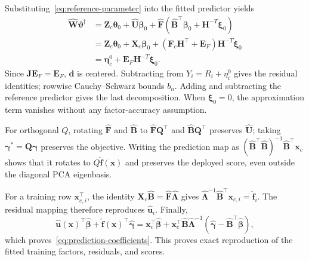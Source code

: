 Substituting~\eqref{eq:reference-parameter} into the fitted predictor yields
\begin{align*}
 \widehat{\bm{W}}\bm{\vartheta}^\dagger
 &=\bm{Z}_c\bm{\theta}_0+\widehat{\bm{U}}\bm{\beta}_0+
       \widehat{\bm{F}}(\widehat{\bm{B}}^\top\bm{\beta}_0+\bm{H}^{-T}\bm{\xi}_0)\\
 &=\bm{Z}_c\bm{\theta}_0+\bm{X}_c\bm{\beta}_0+
       (\bm{F}_c\bm{H}^\top+\bm{E}_F)\bm{H}^{-T}\bm{\xi}_0\\
 &=\bm{\eta}_c^0+\bm{E}_F\bm{H}^{-T}\bm{\xi}_0.
\end{align*}
Since $\bm{J}\bm{E}_F=\bm{E}_F$, $\mathbf d$ is centered. Subtracting from $Y_i=R_i+\eta_i^0$ gives the residual identities; rowwise Cauchy--Schwarz bounds $b_n$. Adding and subtracting the reference predictor gives the last decomposition. When $\bm{\xi}_0=0$, the approximation term vanishes without any factor-accuracy assumption.

For orthogonal $Q$, rotating $\widehat{\bm{F}}$ and $\widehat{\bm{B}}$ to $\widehat{\bm{F}}\bm{Q}^\top$ and $\widehat{\bm{B}}\bm{Q}^\top$ preserves $\widehat{\bm{U}}$; taking $\bm{\gamma}^*=\bm{Q}\bm{\gamma}$ preserves the objective. Writing the prediction map as $(\widehat{\bm{B}}^\top\widehat{\bm{B}})^{-1}\widehat{\bm{B}}^\top \bm{x}_c$ shows that it rotates to $Q\widehat{\bm{f}}(\bm{x})$ and preserves the deployed score, even outside the diagonal PCA eigenbasis.

For a training row $\bm{x}_{c,i}^\top$, the identity $\bm{X}_c\widehat{\bm{B}}=\widehat{\bm{F}}\widehat{\bm{\Lambda}}$ gives $\widehat{\bm{\Lambda}}^{-1}\widehat{\bm{B}}^\top \bm{x}_{c,i}=\widehat{\bm{f}}_i$. The residual mapping therefore reproduces $\widehat{\bm{u}}_i$. Finally,
\[
 \widehat{\bm{u}}(\bm{x})^\top\widehat{\bm{\beta}}+
 \widehat{\bm{f}}(\bm{x})^\top\widehat{\bm{\gamma}}
 =\bm{x}_c^\top\widehat{\bm{\beta}}+
 \bm{x}_c^\top\widehat{\bm{B}}\widehat{\bm{\Lambda}}^{-1}
          (\widehat{\bm{\gamma}}-\widehat{\bm{B}}^\top\widehat{\bm{\beta}}),
\]
which proves~\eqref{eq:prediction-coefficients}. This proves exact reproduction of the fitted training factors, residuals, and scores.

